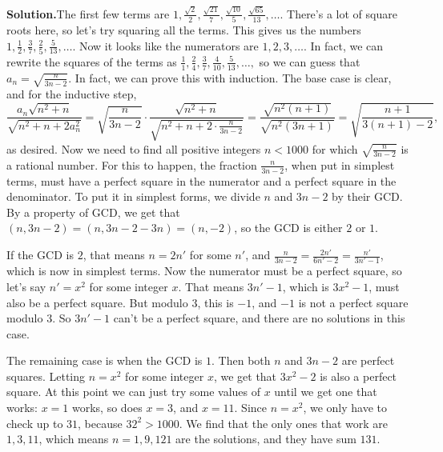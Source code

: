 \documentclass[11pt,paper=letter]{scrartcl}
\newcommand{\sol}{{\sffamily \bfseries Solution.}\;}
\begin{document}
\begin{enumerate}[align=left,leftmargin=*,resume]
\sol The first few terms are $
  1, \frac{\sqrt{2}}{2}, \frac{\sqrt{21}}{7}, \frac{\sqrt{10}}{5}, \frac{\sqrt{65}}{13}, \ldots
$.
There's a lot of square roots here, so let's try squaring all the terms. This gives us the numbers $1, \frac{1}{2}, \frac{3}{7}, \frac{2}{5}, \frac{5}{13}, \ldots$. Now it looks like the numerators are $1, 2, 3, \ldots$. In fact, we can rewrite the squares of the terms as $\frac{1}{1}, \frac{2}{4}, \frac{3}{7}, \frac{4}{10}, \frac{5}{13}, \ldots,$ so we can guess that $a_n = \sqrt{\frac{n}{3n-2}}$. In fact, we can prove this with induction. The base case is clear, and for the inductive step, \[
\frac{a_n\sqrt{n^2 + n}}{\sqrt{n^2 + n + 2a_n^2}}
= \sqrt{\frac{n}{3n-2}} \cdot \frac{\sqrt{n^2 + n}}{\sqrt{n^2 + n + 2 \cdot \frac{n}{3n-2}}}
= \frac{\sqrt{n^2 (n + 1)}}{\sqrt{n^2(3n + 1)}} = \sqrt{\frac{n + 1}{3\left(n + 1\right) - 2}},
\]
as desired. Now we need to find all positive integers $n < 1000$ for which $\sqrt{\frac{n}{3n-2}}$ is a rational number. For this to happen, the fraction $\frac{n}{3n-2}$, when put in simplest terms, must have a perfect square in the numerator and a perfect square in the denominator. To put it in simplest forms, we divide $n$ and $3n-2$ by their GCD. By a property of GCD, we get that $(n, 3n - 2) = (n, 3n - 2 - 3n) = (n, -2)$, so the GCD is either $2$ or $1$.

If the GCD is $2$, that means $n = 2n'$ for some $n'$, and $\frac{n}{3n - 2} = \frac{2n'}{6n' - 2} = \frac{n'}{3n' - 1}$, which is now in simplest terms. Now the numerator must be a perfect square, so let's say $n' = x^2$ for some integer $x$. That means $3n' - 1$, which is $3x^2 - 1$, must also be a perfect square. But modulo $3$, this is $-1$, and $-1$ is not a perfect square modulo $3$. So $3n' - 1$ can't be a perfect square, and there are no solutions in this case.

The remaining case is when the GCD is $1$. Then both $n$ and $3n - 2$ are perfect squares. Letting $n = x^2$ for some integer $x$, we get that $3x^2 - 2$ is also a perfect square. At this point we can just try some values of $x$ until we get one that works: $x = 1$ works, so does $x = 3$, and $x = 11$. Since $n = x^2$, we only have to check up to $31$, because $32^2 > 1000$. We find that the only ones that work are $1, 3, 11$, which means $n = 1, 9, 121$ are the solutions, and they have sum $131$.


\end{enumerate}
\end{document}
